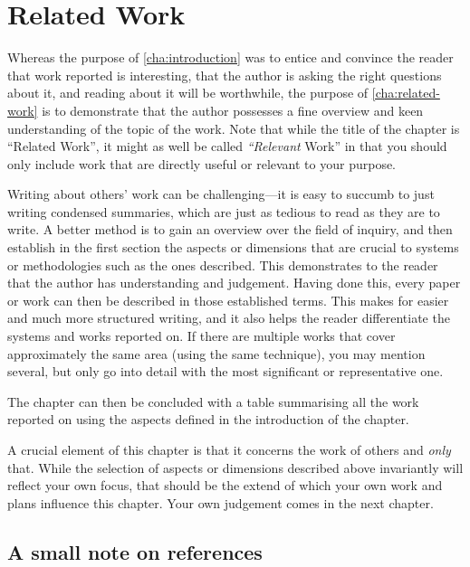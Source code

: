 \chapter{Related Work}
\label{cha:related-work}

Whereas the purpose of \autoref{cha:introduction} was to entice and
convince the reader that work reported is interesting, that the author
is asking the right questions about it, and reading about it will be
worthwhile, the purpose of \autoref{cha:related-work} is to
demonstrate that the author possesses a fine overview and keen
understanding of the topic of the work.  Note that while the title of
the chapter is ``Related Work'', it might as well be called
\emph{``Relevant} Work'' in that you should only include work that are
directly useful or relevant to your purpose. 

Writing about others' work can be challenging---it is easy to succumb
to just writing condensed summaries, which are just as tedious to read
as they are to write. A better method is to gain an overview over the
field of inquiry, and then establish in the first section the aspects
or dimensions that are crucial to systems or methodologies such as the
ones described. This demonstrates to the reader that the author has
understanding and judgement. Having done this, every paper or work can
then be described in those established terms. This makes for easier
and much more structured writing, and it also helps the reader
differentiate the systems and works reported on. If there are multiple
works that cover approximately the same area (\eg using the same
technique), you may mention several, but only go into detail with the
most significant or representative one.

The chapter can then be concluded with a table summarising all the
work reported on using the aspects defined in the introduction of the
chapter.

A crucial element of this chapter is that it concerns the work of
others and \emph{only} that. While the selection of aspects or
dimensions described above invariantly will reflect your own focus,
that should be the extend of which your own work and plans influence
this chapter.  Your own judgement comes in the next chapter.


\section{A small note on references}
\label{sec:small-note-refer}

